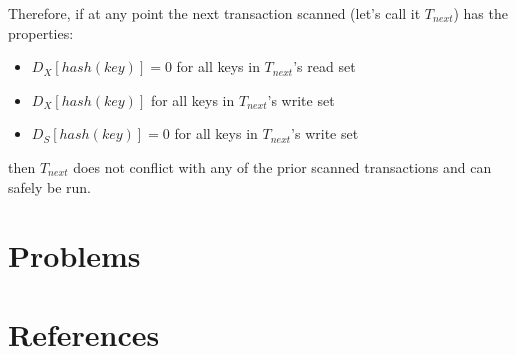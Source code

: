 \documentclass[11pt]{article}
\begin{document}
Therefore, if at any point the next transaction scanned (let's call it \(T_{next}\)) has the
properties:
\begin{itemize}
\item \(D_X[hash(key)]=0\) for all keys in \(T_{next}\)'s read set
\item \(D_X[hash(key)]\) for all keys in \(T_{next}\)'s write set
\item \(D_S[hash(key)]=0\) for all keys in \(T_{next}\)'s write set
\end{itemize}
then \(T_{next}\) does not conflict with any of the prior scanned transactions and can safely be run.
\section{Problems}
\label{sec:org1719ea7}


\section{References}
\label{sec:org03a281a}
\label{bibliographystyle link}


\label{bibliography link}

\end{document}
